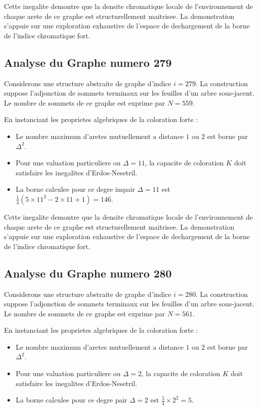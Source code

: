 \documentclass[11pt,a4paper]{article}
\begin{document}
Cette inegalite demontre que la densite chromatique locale de l'environnement de chaque arete de ce graphe est structurellement maitrisee. La demonstration s'appuie sur une exploration exhaustive de l'espace de dechargement de la borne de l'indice chromatique fort.

\subsection{Analyse du Graphe numero 279}
Considerons une structure abstraite de graphe d'indice $i = 279$. La construction suppose l'adjonction de sommets terminaux sur les feuilles d'un arbre sous-jacent. Le nombre de sommets de ce graphe est exprime par $N = 559$.

En instanciant les proprietes algebriques de la coloration forte :
\begin{itemize}
\item Le nombre maximum d'aretes mutuellement a distance $1$ ou $2$ est borne par $\Delta^2$.
\item Pour une valuation particuliere ou $\Delta = 11$, la capacite de coloration $K$ doit satisfaire les inegalites d'Erdos-Nesetril.
\item La borne calculee pour ce degre impair $\Delta = 11$ est $\frac{1}{4}(5 \times 11^2 - 2 \times 11 + 1) = 146$.
\end{itemize}

Cette inegalite demontre que la densite chromatique locale de l'environnement de chaque arete de ce graphe est structurellement maitrisee. La demonstration s'appuie sur une exploration exhaustive de l'espace de dechargement de la borne de l'indice chromatique fort.

\subsection{Analyse du Graphe numero 280}
Considerons une structure abstraite de graphe d'indice $i = 280$. La construction suppose l'adjonction de sommets terminaux sur les feuilles d'un arbre sous-jacent. Le nombre de sommets de ce graphe est exprime par $N = 561$.

En instanciant les proprietes algebriques de la coloration forte :
\begin{itemize}
\item Le nombre maximum d'aretes mutuellement a distance $1$ ou $2$ est borne par $\Delta^2$.
\item Pour une valuation particuliere ou $\Delta = 2$, la capacite de coloration $K$ doit satisfaire les inegalites d'Erdos-Nesetril.
\item La borne calculee pour ce degre pair $\Delta = 2$ est $\frac{5}{4} \times 2^2 = 5$.
\end{itemize}
\end{document}

